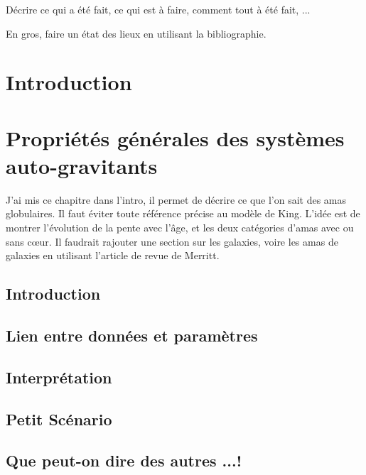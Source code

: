 Décrire ce qui a été fait, ce qui est à faire, comment tout à été fait, ...

En gros, faire un état des lieux en utilisant la bibliographie.

\chapter{Introduction}%
	\minitoc
	  
		
		
\chapter{Propriétés générales des systèmes auto-gravitants}

J'ai mis ce chapitre dans l'intro, il permet de décrire ce que l'on sait des amas globulaires. Il faut éviter toute référence précise au modèle de King. L'idée est de montrer l'évolution de la pente avec l'âge, et les deux catégories d'amas avec ou sans c\oe ur.
 Il faudrait rajouter une section sur les galaxies, voire les amas de galaxies en utilisant l'article de revue de Merritt.

	\minitoc
	\section{Introduction}
		

	\section[Lien]{Lien entre données et paramètres\label{amas}}
		

	\section{Interprétation}
		

	\section{Petit Scénario\label{petit_scenar}}
		

	\section{Que peut-on dire des autres ...!}
		
